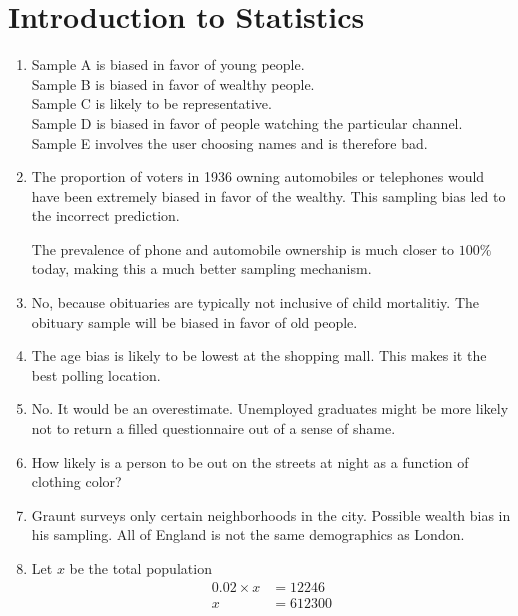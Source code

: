 \chapter{Introduction to Statistics}

\begin{enumerate}
	\item Sample A is biased in favor of young people. \\ Sample B is biased in favor of wealthy people.  \\ Sample C is likely to be representative. \\ Sample D is biased in favor of people watching the particular channel. \\ Sample E involves the user choosing names and is therefore bad.
	
	\item The proportion of voters in 1936 owning automobiles or telephones would have been extremely biased in favor of the wealthy. This sampling bias led to the incorrect prediction.
	
	The prevalence of phone and automobile ownership is much closer to $ 100 \% $ today, making this a much better sampling mechanism. 
	
	\item No, because obituaries are typically not inclusive of child mortalitiy. The obituary sample will be biased in favor of old people.
	
	\item The age bias is likely to be lowest at the shopping mall. This makes it the best polling location.
	
	\item No. It would be an overestimate. Unemployed graduates might be more likely not to return a filled questionnaire out of a sense of shame. 
	
	\item How likely is a person to be out on the streets at night as a function of clothing color? 
	
	\item Graunt surveys only certain neighborhoods in the city. Possible wealth bias in his sampling. All of England is not the same demographics as London.
	
	\item Let $ x $ be the total population \\
	
	
		\begin{align}
			0.02 \times x &= 12246 \\
			x &= 612300
		\end{align}
	

\end{enumerate}
